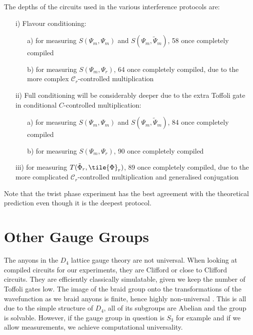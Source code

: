 \documentclass[two column]{article}
\begin{document}
The depths of the circuits used in the various interference protocols are:\begin{itemize}
	\item[i)] Flavour conditioning: \begin{enumerate}
		\item[a)] for measuring $S(\Psi_m, \Psi_m)$ and $S(\Psi_m, \tilde{\Psi}_m)$, 58 once completely compiled
		\item[b)] for measuring $S(\Psi_m, \Psi_r)$, 64 once completely compiled, due to the more complex $\mathcal{C}_r$-controlled multiplication
	\end{enumerate}
	
	\item[ii)] Full conditioning will be considerably deeper due to the extra Toffoli gate in conditional $C$-controlled multiplication: \begin{enumerate}
		\item[a)] for measuring $S(\Psi_m, \Psi_m)$ and $S(\Psi_m, \tilde{\Psi}_m)$, 84 once completely compiled
		\item[b)] for measuring $S(\Psi_m, \Psi_r)$, 90 once completely compiled
	\end{enumerate}  
	
	\item[iii)] for measuring $T(\tilde{\Phi}_r, \tile{\Phi}_r)$, 89 once completely compiled, due to the more complicated $\mathcal{C}_r$-controlled multiplication and generalised conjugation 
\end{itemize}

Note that the twist phase experiment has the best agreement with the theoretical prediction even though it is the deepest protocol.

\section{Other Gauge Groups}

The anyons in the $D_4$ lattice gauge theory are not universal. 
When looking at compiled circuits for our experiments, they are Clifford or close to Clifford circuits.
They are efficiently classically simulatable, given we keep the number of Toffoli gates low.
The image of the braid group onto the transformations of the wavefunction as we braid anyons is finite, hence highly non-universal \cite{}.
This is all due to the simple structure of $D_4$, all of its subgroups are Abelian and the group is solvable.
However, if the gauge group in question is $S_3$ for example and if we allow measurements, we achieve computational universality.
\end{document}
